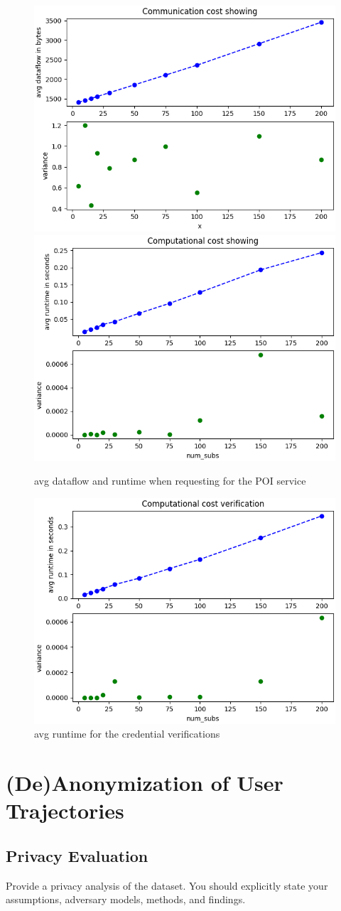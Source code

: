 \documentclass[10pt,conference,compsocconf]{IEEEtran}
\begin{document}
\begin{figure}[h!]
    \includegraphics[width=0.49\linewidth]{../performance_analysis/dataflow_showing.png}
    \includegraphics[width=0.49\linewidth]{../performance_analysis/runtime_showing.png}
    \caption{avg dataflow and runtime when requesting for the POI service}
    \label{fig:showing}
\end{figure}

\begin{figure}[h!]
    \includegraphics[width=0.49\linewidth]{../performance_analysis/runtime_verification}
    \caption{avg runtime for the credential verifications}
    \label{fig:verify}
\end{figure}


\section{(De)Anonymization of User Trajectories}

\subsection{Privacy Evaluation}
Provide a privacy analysis of the dataset. You should explicitly state your assumptions, adversary
models, methods, and findings.
\end{document}
